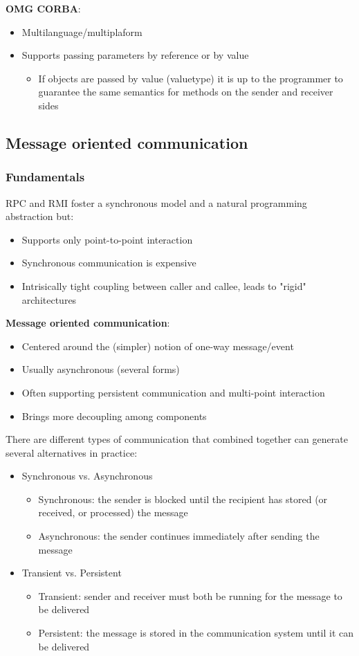 \documentclass[10pt,a4paper]{article}
\begin{document}
\textbf{OMG CORBA}:
\begin{itemize}
	\item Multilanguage/multiplaform
	\item Supports passing parameters by reference or by value
	\begin{itemize}
		\item If objects are passed by value (valuetype) it is up to the programmer to guarantee the same semantics for methods on the sender and receiver sides
	\end{itemize}
\end{itemize}
\subsection{Message oriented communication}
\subsubsection{Fundamentals}
RPC and RMI foster a synchronous model and a natural programming abstraction but:
\begin{itemize}
	\item Supports only point-to-point interaction
	\item Synchronous communication is expensive
	\item Intrisically tight coupling between caller and callee, leads to "rigid" architectures
\end{itemize}
\textbf{Message oriented communication}:
\begin{itemize}
	\item Centered around the (simpler) notion of one-way message/event
	\item Usually asynchronous (several forms)
	\item Often supporting persistent communication and multi-point interaction
	\item Brings more decoupling among components
\end{itemize}
There are different types of communication that combined together can generate several alternatives in practice:
\begin{itemize}
	\item Synchronous vs. Asynchronous
	\begin{itemize}
		\item Synchronous: the sender is blocked until the recipient has stored (or received, or processed) the message
		\item Asynchronous: the sender continues immediately after sending the message
	\end{itemize}
	\item Transient vs. Persistent
	\begin{itemize}
		\item Transient: sender and receiver must both be running for the message to be delivered
		\item Persistent: the message is stored in the communication system until it can be delivered
	\end{itemize}
\end{itemize}
\end{document}
